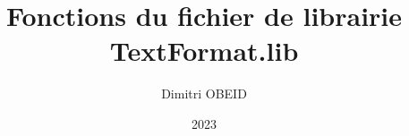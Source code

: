 \documentclass[a4paper,10pt]{article}
\title{\color{sec1}Fonctions du fichier de librairie \color{path}TextFormat.lib}\color{text}
\author{Dimitri OBEID}
\date{2023}
\begin{document}
\maketitle
\newpage

\hypertarget{contents}{}
\tableofcontents
\newpage
\end{document}
